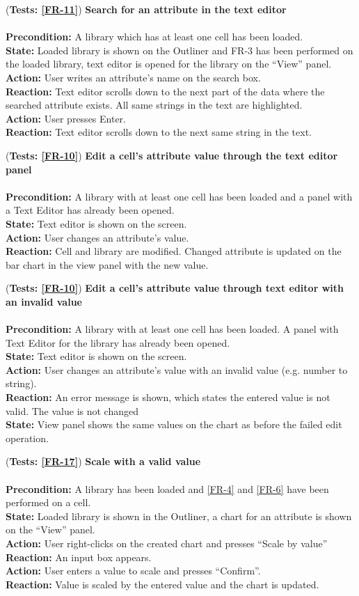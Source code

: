 \documentclass[10pt,a4paper]{report}
\newcommand{\precondition}[1]{
    \textbf{Precondition: } #1 \leavevmode \\
}
\newcommand{\action}[1]{
    \textbf{Action: } #1 \leavevmode \\
}
\newcommand{\state}[1]{
    \textbf{State: } #1 \leavevmode \\
}
\newcommand{\reaction}[1]{
    \textbf{Reaction: } #1 \leavevmode \\
}
\newcommand{\GTCDescription}[2]{
    (\textbf{Tests: #1}) \textbf{#2} \leavevmode \\
}
\begin{document}
\begin{GTC}
    \item \GTCDescription{\ref{FR-11}}
    {Search for an attribute in the text editor} \leavevmode \\ 
        \precondition{A library which has at least one cell has been loaded.}
        \state{Loaded library is shown on the Outliner and FR-3 has been performed on the loaded library, text editor is opened for the library on the “View” panel.}
        \action{User writes an attribute's name on the search box.}
        \reaction{Text editor scrolls down to the next part of the data where the searched attribute exists. All same strings in the text are highlighted.}
        \action{User presses Enter.}
        \reaction{Text editor scrolls down to the next same string in the text.}\label{GTC-37}
    
    \item \GTCDescription{\ref{FR-10}}
    {Edit a cell's attribute value through the text editor panel} \leavevmode \\ 
        \precondition{A library with at least one cell has been loaded and a panel with a Text Editor has already been opened.}
        \state{Text editor is shown on the screen.}
        \action{User changes an attribute's value.}
        \reaction{Cell and library are modified. Changed attribute is updated on the bar chart in the view panel with the new value.}\label{GTC-38}
    
    \item \GTCDescription{\ref{FR-10}}
    {Edit a cell's attribute value through text editor with an invalid value} \leavevmode \\ 
        \precondition{A library with at least one cell has been loaded. A panel with Text Editor for the library has already been opened.}
        \state{Text editor is shown on the screen.}
        \action{User changes an attribute's value with an invalid value (e.g. number to string).}
        \reaction{An error message is shown, which states the entered value is not valid. The value is not changed}
        \state{View panel shows the same values on the chart as before the failed edit operation.}\label{GTC-39}
    
    \item \GTCDescription{\ref{FR-17}}
    {Scale with a valid value} \leavevmode \\ 
        \precondition{A library has been loaded and \ref{FR-4} and \ref{FR-6} have been performed on a cell.}
        \state{Loaded library is shown in the Outliner, a chart for an attribute is shown on the “View” panel.}
        \action{User right-clicks on the created chart and presses “Scale by value”}
        \reaction{An input box appears.}
        \action{User enters a value to scale and presses “Confirm”.}
        \reaction{Value is scaled by the entered value and the chart is updated.}\label{GTC-40}
    

\end{GTC}
\end{document}
